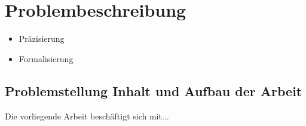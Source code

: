 \chapter{Problembeschreibung}
\label{chap:problemstellung}
\minitoc
\begin{itemize}
\item Präzisierung
\item Formalisierung
\end{itemize}
\section{Problemstellung Inhalt und Aufbau der Arbeit}
Die vorliegende Arbeit beschäftigt sich mit$\ldots$
